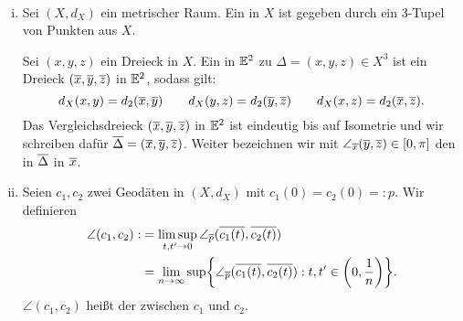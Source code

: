 \begin{definition}
\label{def:2.41}
	\mbox{} \\[-1.35cm]
	\begin{enumerate}[(i)]
		\item Sei $(X,d_X)$ ein metrischer Raum. 
		Ein  in $X$ ist gegeben durch ein $3$-Tupel von Punkten aus $X$.
		
		Sei $(x,y,z)$ ein Dreieck in $X$.
		Ein  in $\mathbb{E}^2$ zu $\Delta = (x,y,z) \in X^3$ ist ein Dreieck $(\overline{x},\overline{y},\overline{z})$ in $\mathbb{E}^2$, sodass gilt:
		\[
			d_X(x,y) = d_2(\overline{x},\overline{y}) \qquad d_X(y,z) = d_2(\overline{y},\overline{z}) \qquad d_X(x,z) = d_2(\overline{x},\overline{z}).
		\]
		Das Vergleichsdreieck $(\overline{x},\overline{y},\overline{z})$ in $\mathbb{E}^2$ ist eindeutig bis auf Isometrie und wir schreiben dafür $\overline{\Delta} = (\overline{x},\overline{y},\overline{z})$.
		Weiter bezeichnen wir mit $\angle_{\overline{x}}(\overline{y},\overline{z}) \in [0,\pi]$ den  in $\overline{\Delta}$ in $\overline{x}$.
		\item Seien $c_1,c_2$ zwei Geodäten in $(X,d_X)$ mit $c_1(0) = c_2(0) =:p$.
		Wir definieren
		\begin{align*}
			\angle(c_1,c_2) :&= \limsup_{t,t' \rightarrow 0} \angle_{\ol{p}} (\ol{c_1(t)},\ol{c_2(t)}) \\
			&= \lim\limits_{n \rightarrow \infty} \sup \penbrace*{ \angle_{\ol{p}}(\ol{c_1(t)},\ol{c_2(t)}) : t,t' \in \enbrace*{0,\frac{1}{n}}}.
		\end{align*}
		$\angle(c_1,c_2)$ heißt der  zwischen $c_1$ und $c_2$.
	\end{enumerate}
\end{definition}

